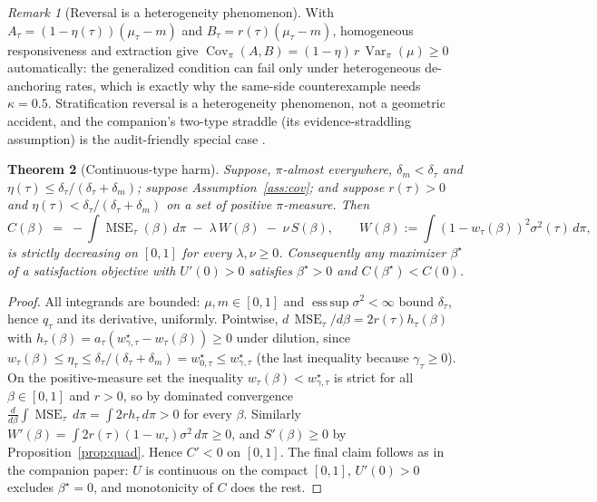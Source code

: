 \documentclass[11pt]{article}
\newtheorem{theorem}{Theorem}[section]
\theoremstyle{definition}
\theoremstyle{remark}
\newtheorem{remark}[theorem]{Remark}
\numberwithin{equation}{section}
\DeclareMathOperator{\MSE}{MSE}
\DeclareMathOperator{\Var}{Var}
\DeclareMathOperator{\Cov}{Cov}
\begin{document}
\begin{remark}[Reversal is a heterogeneity phenomenon]\label{rem:homog}
With $A_\tau = (1-\eta(\tau))(\mu_\tau - m)$ and $B_\tau = r(\tau)(\mu_\tau - m)$, homogeneous responsiveness and extraction give $\Cov_\pi(A,B) = (1-\eta)\,r\,\Var_\pi(\mu) \ge 0$ automatically: the generalized condition can fail only under heterogeneous de-anchoring rates, which is exactly why the same-side counterexample needs $\kappa = 0.5$. Stratification reversal is a heterogeneity phenomenon, not a geometric accident, and the companion's two-type straddle (its evidence-straddling assumption) is the audit-friendly special case \citep{hofheinz2026civic}.
\end{remark}

\begin{theorem}[Continuous-type harm]\label{thm:contA}
Suppose, $\pi$-almost everywhere, $\delta_m < \delta_\tau$ and $\eta(\tau) \le \delta_\tau/(\delta_\tau + \delta_m)$; suppose Assumption~\ref{ass:cov}; and suppose $r(\tau) > 0$ and $\eta(\tau) < \delta_\tau/(\delta_\tau + \delta_m)$ on a set of positive $\pi$-measure. Then
\[
C(\beta) \;=\; -\int \MSE_\tau(\beta)\,d\pi \;-\; \lambda\,W(\beta) \;-\; \nu\,S(\beta),
\qquad W(\beta) := \int (1-w_\tau(\beta))^2\sigma^2(\tau)\,d\pi,
\]
is strictly decreasing on $[0,1]$ for every $\lambda, \nu \ge 0$. Consequently any maximizer $\beta^\star$ of a satisfaction objective with $U'(0) > 0$ satisfies $\beta^\star > 0$ and $C(\beta^\star) < C(0)$.
\end{theorem}
\begin{proof}
All integrands are bounded: $\mu, m \in [0,1]$ and $\operatorname{ess\,sup}\sigma^2 < \infty$ bound $\delta_\tau$, hence $q_\tau$ and its derivative, uniformly. Pointwise, $d\,\MSE_\tau/d\beta = 2r(\tau)h_\tau(\beta)$ with $h_\tau(\beta) = a_\tau(w^\star_{\gamma,\tau} - w_\tau(\beta)) \ge 0$ under dilution, since $w_\tau(\beta) \le \eta_\tau \le \delta_\tau/(\delta_\tau+\delta_m) = w^\star_{0,\tau} \le w^\star_{\gamma,\tau}$ (the last inequality because $\gamma_\tau \ge 0$). On the positive-measure set the inequality $w_\tau(\beta) < w^\star_{\gamma,\tau}$ is strict for all $\beta \in [0,1]$ and $r > 0$, so by dominated convergence $\frac{d}{d\beta}\int \MSE_\tau\,d\pi = \int 2r h_\tau\,d\pi > 0$ for every $\beta$. Similarly $W'(\beta) = \int 2r(\tau)(1-w_\tau)\sigma^2\,d\pi \ge 0$, and $S'(\beta) \ge 0$ by Proposition~\ref{prop:quad}. Hence $C' < 0$ on $[0,1]$. The final claim follows as in the companion paper: $U$ is continuous on the compact $[0,1]$, $U'(0) > 0$ excludes $\beta^\star = 0$, and monotonicity of $C$ does the rest.
\end{proof}
\end{document}
